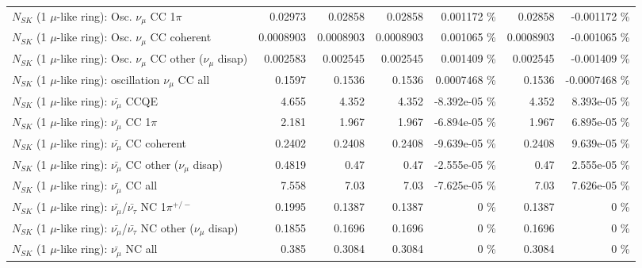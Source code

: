 \begin{table}
\begin{tabular}{| l | r | r | r  r | r  r |}
                          $N_{SK}$ (1 $\mu$-like ring): Osc. $\nu_\mu$ CC 1$\pi$ &         0.02973 &         0.02858 &         0.02858 & 0.001172 \%  &         0.02858 & -0.001172 \%  \\ 
                        $N_{SK}$ (1 $\mu$-like ring): Osc. $\nu_\mu$ CC coherent &       0.0008903 &       0.0008903 &       0.0008903 & 0.001065 \%  &       0.0008903 & -0.001065 \%  \\ 
         $N_{SK}$ (1 $\mu$-like ring): Osc. $\nu_\mu$ CC other ($\nu_\mu$ disap) &        0.002583 &        0.002545 &        0.002545 & 0.001409 \%  &        0.002545 & -0.001409 \%  \\ 
                      $N_{SK}$ (1 $\mu$-like ring): oscillation $\nu_\mu$ CC all &          0.1597 &          0.1536 &          0.1536 & 0.0007468 \%  &          0.1536 & -0.0007468 \%  \\ 
\hline
\hline
                              $N_{SK}$ (1 $\mu$-like ring): $\bar{\nu_\mu}$ CCQE &           4.655 &           4.352 &           4.352 & -8.392e-05 \%  &           4.352 & 8.393e-05 \%  \\ 
                         $N_{SK}$ (1 $\mu$-like ring): $\bar{\nu_\mu}$ CC 1$\pi$ &           2.181 &           1.967 &           1.967 & -6.894e-05 \%  &           1.967 & 6.895e-05 \%  \\ 
                       $N_{SK}$ (1 $\mu$-like ring): $\bar{\nu_\mu}$ CC coherent &          0.2402 &          0.2408 &          0.2408 & -9.639e-05 \%  &          0.2408 & 9.639e-05 \%  \\ 
        $N_{SK}$ (1 $\mu$-like ring): $\bar{\nu_\mu}$ CC other ($\nu_\mu$ disap) &          0.4819 &            0.47 &            0.47 & -2.555e-05 \%  &            0.47 & 2.555e-05 \%  \\ 
                          $N_{SK}$ (1 $\mu$-like ring): $\bar{\nu_{\mu}}$ CC all &           7.558 &            7.03 &            7.03 & -7.625e-05 \%  &            7.03 & 7.626e-05 \%  \\ 
\hline
  $N_{SK}$ (1 $\mu$-like ring): $\bar{\nu_\mu}$/$\bar{\nu_\tau}$ NC 1$\pi^{+/-}$ &          0.1995 &          0.1387 &          0.1387 &        0 \%  &          0.1387 &        0 \%  \\ 
$N_{SK}$ (1 $\mu$-like ring): $\bar{\nu_\mu}$/$\bar{\nu_\tau}$ NC other ($\nu_\mu$ disap) &          0.1855 &          0.1696 &          0.1696 &        0 \%  &          0.1696 &        0 \%  \\ 
                          $N_{SK}$ (1 $\mu$-like ring): $\bar{\nu_{\mu}}$ NC all &           0.385 &          0.3084 &          0.3084 &        0 \%  &          0.3084 &        0 \%  \\ 

\end{tabular}
\end{table}
